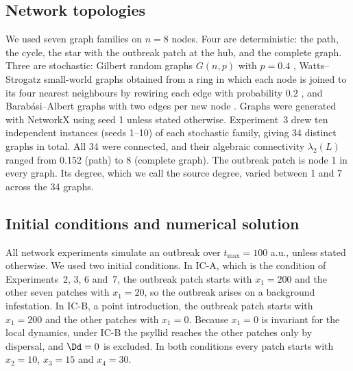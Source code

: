 \subsection{Network topologies}
\label{sec:topologies}

We used seven graph families on $n = 8$ nodes. Four are deterministic: the path, the cycle, the star with the outbreak patch at the hub, and the complete graph. Three are stochastic: Gilbert random graphs $G(n,p)$ with $p = 0.4$ \citep{gilbert1959}, Watts--Strogatz small-world graphs obtained from a ring in which each node is joined to its four nearest neighbours by rewiring each edge with probability $0.2$ \citep{watts1998}, and Barab\'asi--Albert graphs with two edges per new node \citep{barabasi1999}. Graphs were generated with NetworkX \citep{hagberg2008} using seed 1 unless stated otherwise. Experiment~3 drew ten independent instances (seeds 1--10) of each stochastic family, giving 34 distinct graphs in total. All 34 were connected, and their algebraic connectivity $\lambda_2(L)$ \citep{fiedler1973} ranged from 0.152 (path) to 8 (complete graph). The outbreak patch is node 1 in every graph. Its degree, which we call the source degree, varied between 1 and 7 across the 34 graphs.

\subsection{Initial conditions and numerical solution}
\label{sec:numerics}

All network experiments simulate an outbreak over $t_{\max} = 100$ a.u., unless stated otherwise. We used two initial conditions. In IC-A, which is the condition of Experiments~2, 3, 6 and~7, the outbreak patch starts with $x_1 = 200$ and the other seven patches with $x_1 = 20$, so the outbreak arises on a background infestation. In IC-B, a point introduction, the outbreak patch starts with $x_1 = 200$ and the other patches with $x_1 = 0$. Because $x_1 = 0$ is invariant for the local dynamics, under IC-B the psyllid reaches the other patches only by dispersal, and $\Dd = 0$ is excluded. In both conditions every patch starts with $x_2 = 10$, $x_3 = 15$ and $x_4 = 30$.

